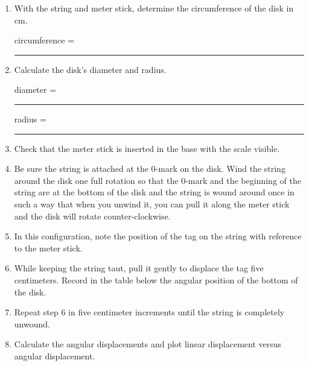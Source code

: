 \begin{enumerate}

\item With the string and meter stick, determine the circumference of the disk in cm.

\bigskip

\begin{center} circumference = \rule{3cm}{0.4pt} \end{center}

\item Calculate the disk's diameter and radius.

\bigskip

\begin{center} diameter = \rule{3cm}{0.4pt} \hspace{1cm} radius = \rule{3cm}{0.4pt} \end{center}

\item Check that the meter stick is inserted in the base with the scale visible.

\item Be sure the string is attached at the 0-mark on the disk. Wind the string around the disk one full rotation so that the 0-mark and the beginning of the string are at the bottom of the disk and the string is wound around once in such a way that when you unwind it, you can pull it along the meter stick and the disk will rotate counter-clockwise.

\item In this configuration, note the position of the tag on the string with reference to the meter stick.

\item While keeping the string taut, pull it gently to displace the tag five centimeters. Record in the table below the angular position of the bottom of the disk.

\item Repeat step 6 in five centimeter increments until the string is completely unwound.

\item Calculate the angular displacements and plot linear displacement versus angular displacement.

\end{enumerate}

\pagebreak

